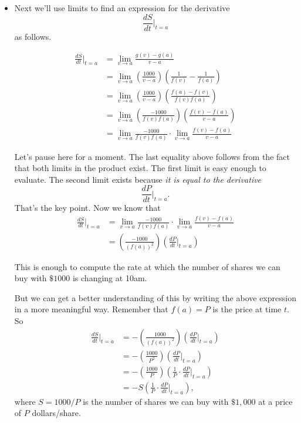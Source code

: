 \documentclass{ximera}
\begin{document}
\begin{question}
\begin{explanation}
\begin{itemize}
This function is
\[
         S = g(t) = \answer{\frac{1000}{f(t)}} \, , \, 0\leq t \leq 8 
\]


\item Next we'll use limits to find an expression for the derivative
\[
    \frac{dS}{dt}\Big|_{t=a} 
\]
as follows.

\begin{align*}
   \frac{dS}{dt}\Big|_{t=a}  &= \lim_{v\to a}\frac{g(v)-g(a)}{v-a}    \\
                                        &= \lim_{v\to a}  \left( \frac{1000}{v-a} \right) \left(   \frac{1}{f(v)} - \frac{1}{f(a)}  \right)  \\
                                 &= \lim_{v\to a}  \left( \frac{1000}{v-a} \right) \left(   \frac{f(a)-f(v)}{f(v)f(a)} \right)  \\
                                 &= \lim_{v\to a}  \left( \frac{-1000}{f(v)f(a)} \right) \left(   \frac{f(v)-f(a)}{v-a}  \right)  \\
                        &= \lim_{v\to a}  \frac{-1000}{f(v)f(a)} \cdot \lim_{v\to a}  \frac{f(v)-f(a)}{v-a}  
\end{align*}

Let's pause here for a moment. The last equality above follows from the fact that both limits in the product exist. The first limit is easy enough to evaluate. The second limit exists because \emph{it is equal to the derivative}
\[
      \frac{dP}{dt}\Big|_{t=a}.
\]
That's the key point. Now we know that
\begin{align*}
   \frac{dS}{dt}\Big|_{t=a}  &= \lim_{v\to a}  \frac{-1000}{f(v)f(a)} \cdot \lim_{v\to a}  \frac{f(v)-f(a)}{v-a} \\
                                       &= \left( \frac{-1000}{(f(a))^2} \right) \left( \frac{dP}{dt}\Big|_{t=a} \right)
\end{align*}

This is enough to compute the rate at which the number of shares we can buy with $\$1000$ is changing at 10am. 

But we can get a better understanding of this by writing the above expression in a more meaningful way. Remember that $f(a) = P$ is the price at time $t$. So 
\begin{align*}
   \frac{dS}{dt}\Big|_{t=a}  &= -\left( \frac{1000}{(f(a))^2} \right) \left( \frac{dP}{dt}\Big|_{t=a} \right) \\
                                         &= -\left( \frac{1000}{P^2} \right) \left( \frac{dP}{dt}\Big|_{t=a} \right) \\             
                                       &= -\left( \frac{1000}{P} \right) \left(\frac{1}{P}\cdot \frac{dP}{dt}\Big|_{t=a} \right) \\
                                         &= - S \left(\frac{1}{P}\cdot \frac{dP}{dt}\Big|_{t=a} \right) ,
\end{align*}
where $S=1000/P$ is the number of shares we can buy with $\$1,000$ at a price of $P$ dollars/share.


\end{itemize}
\end{explanation}
\end{question}
\end{document}
